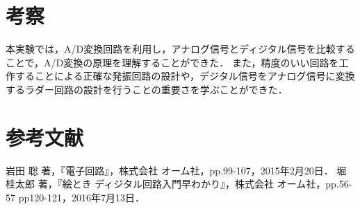 \documentclass[a4paper,11pt,dvipdfmx]{jsarticle}
\begin{document}
\section{考察}
本実験では，A/D変換回路を利用し，アナログ信号とディジタル信号を比較することで，A/D変換の原理を理解することができた．
また，精度のいい回路を工作することによる正確な発振回路の設計や，デジタル信号をアナログ信号に変換するラダー回路の設計を行うことの重要さを学ぶことができた．


\section{参考文献}
\begin{thebibliography}{99}
  岩田 聡 著，『電子回路』，株式会社 オーム社，pp.99-107，2015年2月20日．
  堀 桂太郎 著，『絵とき ディジタル回路入門早わかり』，株式会社 オーム社，pp.56-57 pp120-121，2016年7月13日．
\end{thebibliography}
\end{document}
